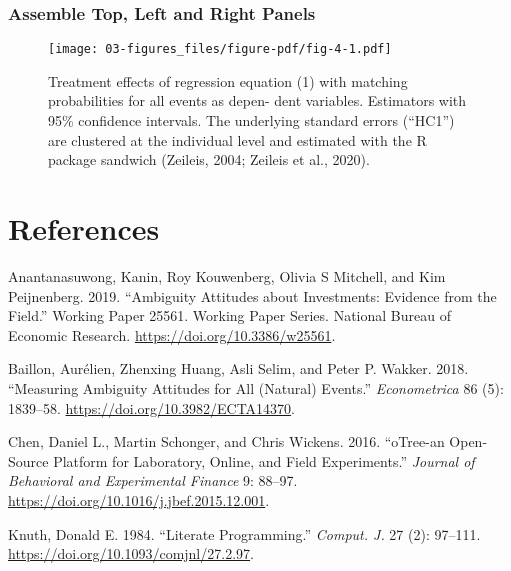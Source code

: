 \documentclass[
  a4paper,
  DIV=11,
  numbers=noendperiod]{scrreprt}
\newlength{\cslhangindent}
\newlength{\cslentryspacingunit} %
\newenvironment{CSLReferences}[2] %
 {%
  \setlength{\parindent}{0pt}
  \ifodd #1
  \let\oldpar\par
  \def\par{\hangindent=\cslhangindent\oldpar}
  \fi
  \setlength{\parskip}{#2\cslentryspacingunit}
 }%
 {}
\begin{document}
\hypertarget{assemble-top-left-and-right-panels-1}{%
\subsection{Assemble Top, Left and Right
Panels}\label{assemble-top-left-and-right-panels-1}}

\begin{figure}

{\centering \texttt{[image: 03-figures\_files/figure-pdf/fig-4-1.pdf]}

}

\caption{\label{fig-4}Treatment effects of regression equation (1) with
matching probabilities for all events as depen- dent variables.
Estimators with 95\% confidence intervals. The underlying standard
errors (``HC1'') are clustered at the individual level and estimated
with the R package sandwich (Zeileis, 2004; Zeileis et al., 2020).}

\end{figure}


\hypertarget{references}{%
\chapter*{References}\label{references}}


\hypertarget{refs}{}
\begin{CSLReferences}{1}{0}
\leavevmode{}%
Anantanasuwong, Kanin, Roy Kouwenberg, Olivia S Mitchell, and Kim
Peijnenberg. 2019. {``Ambiguity Attitudes about Investments: Evidence
from the Field.''} Working Paper 25561. Working Paper Series. National
Bureau of Economic Research. \url{https://doi.org/10.3386/w25561}.

\leavevmode{}%
Baillon, Aurélien, Zhenxing Huang, Asli Selim, and Peter P. Wakker.
2018. {``Measuring Ambiguity Attitudes for All (Natural) Events.''}
\emph{Econometrica} 86 (5): 1839--58.
\url{https://doi.org/10.3982/ECTA14370}.

\leavevmode{}%
Chen, Daniel L., Martin Schonger, and Chris Wickens. 2016. {``oTree-an
Open-Source Platform for Laboratory, Online, and Field Experiments.''}
\emph{Journal of Behavioral and Experimental Finance} 9: 88--97.
\url{https://doi.org/10.1016/j.jbef.2015.12.001}.

\leavevmode{}%
Knuth, Donald E. 1984. {``Literate Programming.''} \emph{Comput. J.} 27
(2): 97--111. \url{https://doi.org/10.1093/comjnl/27.2.97}.

\end{CSLReferences}
\end{document}
